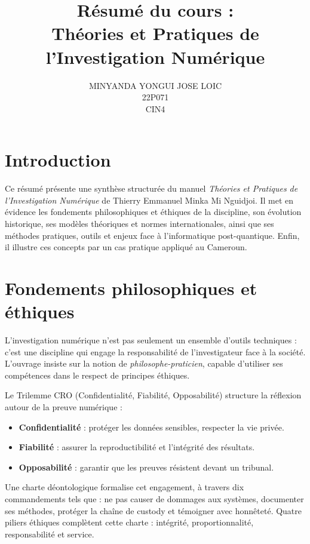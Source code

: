 \documentclass[12pt,a4paper]{article}
\title{Résumé du cours : \\ \textbf{Théories et Pratiques de l’Investigation Numérique}}
\author{MINYANDA YONGUI JOSE LOIC \\ 22P071 \\ CIN4}
\date{}
\begin{document}
\maketitle

\section*{Introduction}

Ce résumé présente une synthèse structurée du manuel \textit{Théories et Pratiques de l’Investigation Numérique} de Thierry Emmanuel Minka Mi Nguidjoi. 
Il met en évidence les fondements philosophiques et éthiques de la discipline, son évolution historique, ses modèles théoriques et normes internationales, ainsi que ses méthodes pratiques, outils et enjeux face à l’informatique post-quantique. 
Enfin, il illustre ces concepts par un cas pratique appliqué au Cameroun.

\section{Fondements philosophiques et éthiques}

L’investigation numérique n’est pas seulement un ensemble d’outils techniques : c’est une discipline qui engage la responsabilité de l’investigateur face à la société. 
L’ouvrage insiste sur la notion de \textit{philosophe-praticien}, capable d’utiliser ses compétences dans le respect de principes éthiques.

Le Trilemme CRO (Confidentialité, Fiabilité, Opposabilité) structure la réflexion autour de la preuve numérique :

\begin{itemize}
    \item \textbf{Confidentialité} : protéger les données sensibles, respecter la vie privée.
    \item \textbf{Fiabilité} : assurer la reproductibilité et l’intégrité des résultats.
    \item \textbf{Opposabilité} : garantir que les preuves résistent devant un tribunal.
\end{itemize}

Une charte déontologique formalise cet engagement, à travers dix commandements tels que : ne pas causer de dommages aux systèmes, documenter ses méthodes, protéger la chaîne de custody et témoigner avec honnêteté. 
Quatre piliers éthiques complètent cette charte : intégrité, proportionnalité, responsabilité et service.
\end{document}
